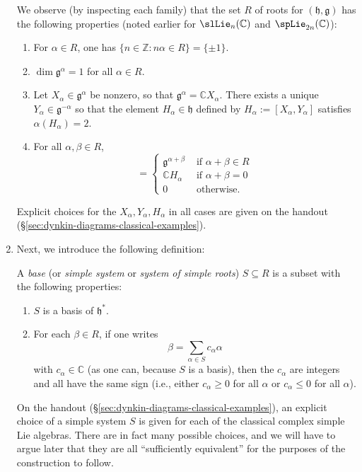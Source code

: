 \documentclass[reqno]{amsart} 
\begin{document}
\begin{enumerate}
  We observe (by inspecting each family) that the set $R$ of roots for $(\mathfrak{h},\mathfrak{g})$ has the following properties (noted earlier for $\slLie_n(\mathbb{C})$ and $\spLie_{2n}(\mathbb{C})$):
  \begin{enumerate}
  \item For $\alpha \in R$, one has $\{n \in \mathbb{Z} : n \alpha \in R\} = \{\pm 1\}$.
  \item $\dim \mathfrak{g}^\alpha = 1$ for all $\alpha \in R$.
  \item Let $X_\alpha \in \mathfrak{g}^\alpha$ be nonzero, so that $\mathfrak{g}^\alpha = \mathbb{C} X_\alpha$.  There exists a unique $Y_\alpha \in \mathfrak{g}^{-\alpha}$ so that the element $H_\alpha \in \mathfrak{h}$ defined by $H_\alpha := [X_\alpha,Y_\alpha]$ satisfies $\alpha(H_\alpha) = 2$.
  \item For all $\alpha,\beta \in R$,
    \begin{equation*}
 [\mathfrak{g}^\alpha, \mathfrak{g}^\beta]
      = 
\begin{cases}
        \mathfrak{g}^{\alpha + \beta} & \text{ if } \alpha + \beta \in R \\
        \mathbb{C} H_\alpha  & \text{ if } \alpha + \beta = 0 \\
        0 & \text{ otherwise.}
      \end{cases}
    \end{equation*}
  \end{enumerate}
  Explicit choices for the $X_\alpha, Y_\alpha, H_\alpha$ in all cases are given on the handout (\S\ref{sec:dynkin-diagrams-classical-examples}).

\item Next, we introduce the following definition:
  \begin{definition}
    A \emph{base} (or \emph{simple system} or \emph{system of simple roots}) $S \subseteq R$ is a subset with the following properties:
    \begin{enumerate}
    \item $S$ is a basis of $\mathfrak{h}^*$.
    \item For each $\beta \in R$, if one writes
      \begin{equation}\label{eq:decomp-in-terms-of-simple-roots}
        \beta = \sum_{\alpha \in S} c_\alpha \alpha
      \end{equation}
      with $c_\alpha \in \mathbb{C}$ (as one can, because $S$ is a basis), then the $c_\alpha$ are integers and all have the same sign (i.e., either $c_\alpha \geq 0$ for all $\alpha$ or $c_\alpha \leq 0$ for all $\alpha$).
    \end{enumerate}
  \end{definition}
  On the handout (\S\ref{sec:dynkin-diagrams-classical-examples}), an explicit choice of a simple system $S$ is given for each of the classical complex simple Lie algebras.  There are in fact many possible choices, and we will have to argue later that they are all ``sufficiently equivalent'' for the purposes of the construction to follow.


\end{enumerate}
\end{document}
